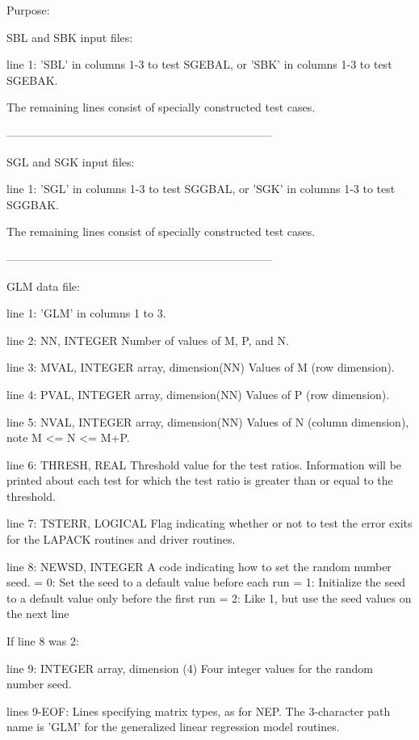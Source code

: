 \begin{DoxyParagraph}{Purpose\+: }
\begin{DoxyVerb}
 SBL and SBK input files:

 line 1:  'SBL' in columns 1-3 to test SGEBAL, or 'SBK' in
          columns 1-3 to test SGEBAK.

 The remaining lines consist of specially constructed test cases.

-----------------------------------------------------------------------

 SGL and SGK input files:

 line 1:  'SGL' in columns 1-3 to test SGGBAL, or 'SGK' in
          columns 1-3 to test SGGBAK.

 The remaining lines consist of specially constructed test cases.

-----------------------------------------------------------------------

 GLM data file:

 line 1:  'GLM' in columns 1 to 3.

 line 2:  NN, INTEGER
          Number of values of M, P, and N.

 line 3:  MVAL, INTEGER array, dimension(NN)
          Values of M (row dimension).

 line 4:  PVAL, INTEGER array, dimension(NN)
          Values of P (row dimension).

 line 5:  NVAL, INTEGER array, dimension(NN)
          Values of N (column dimension), note M <= N <= M+P.

 line 6:  THRESH, REAL
          Threshold value for the test ratios.  Information will be
          printed about each test for which the test ratio is greater
          than or equal to the threshold.

 line 7:  TSTERR, LOGICAL
          Flag indicating whether or not to test the error exits for
          the LAPACK routines and driver routines.

 line 8:  NEWSD, INTEGER
          A code indicating how to set the random number seed.
          = 0:  Set the seed to a default value before each run
          = 1:  Initialize the seed to a default value only before the
                first run
          = 2:  Like 1, but use the seed values on the next line

 If line 8 was 2:

 line 9:  INTEGER array, dimension (4)
          Four integer values for the random number seed.

 lines 9-EOF:  Lines specifying matrix types, as for NEP.
          The 3-character path name is 'GLM' for the generalized
          linear regression model routines.


\end{DoxyVerb}
\end{DoxyParagraph}
